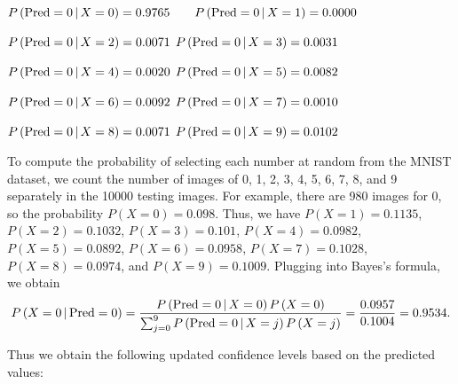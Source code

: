 \documentclass[11pt]{amsart}
\begin{document}
$P\left({\rm Pred}=0\,|\,X=0\right)=0.9765 \qquad P\left({\rm Pred}=0\,|\,X=1\right)=0.0000$

$P\left({\rm Pred}=0\,|\,X=2\right)=0.0071$ \qquad $P\left({\rm Pred}=0\,|\,X=3\right)=0.0031$

$P\left({\rm Pred}=0\,|\,X=4\right)=0.0020$ \qquad $P\left({\rm Pred}=0\,|\,X=5\right)=0.0082$

$P\left({\rm Pred}=0\,|\,X=6\right)=0.0092$ \qquad $P\left({\rm Pred}=0\,|\,X=7\right)=0.0010$

$P\left({\rm Pred}=0\,|\,X=8\right)=0.0071$ \qquad $P\left({\rm Pred}=0\,|\,X=9\right)=0.0102$
\medskip

To compute the probability of selecting each number at random from the MNIST dataset, we count the number of images of 0, 1, 2, 3, 4, 5, 6, 7, 8, and 9 separately in the 10000 testing images. For example, there are 980 images for 0, so the probability  $P\left(X=0\right)=0.098$. Thus, we have $P\left(X=1\right)=0.1135$,
$P\left(X=2\right)=0.1032$, $P\left(X=3\right)=0.101$, $P\left(X=4\right)=0.0982$, $P\left(X=5\right)=0.0892$,
$P\left(X=6\right)=0.0958$, $P\left(X=7\right)=0.1028$, $P\left(X=8\right)=0.0974$, and $P\left(X=9\right)=0.1009$.  Plugging into Bayes's formula, we obtain
$$
P\left(X=0\,|\, {\rm Pred}=0\right)=\frac{P\left({\rm Pred}=0\,|\, X=0\right)P\left(X=0\right)}{\sum_{j=0}^9P\left({\rm Pred}=0\,|\,X=j\right)P\left(X=j\right)}
=\frac{0.0957}{0.1004}=0.9534.
$$

Thus we obtain the following updated confidence levels based on the predicted values:
\end{document}
